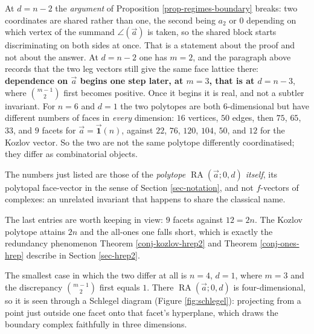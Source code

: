 \documentclass[11pt, a4paper, abstract=yes]{scrartcl}
\theoremstyle{definition}
\theoremstyle{remark}
\theoremstyle{plain}
\newcommand{\rasimp}{\angle}
\newcommand{\RA}{\operatorname{RA}}
\newcommand{\onesvec}{\vec{\mathbf 1}}
\begin{document}
At \(d=n-2\) the \emph{argument} of Proposition \ref{prop-regimes-boundary} breaks: two coordinates are
shared rather than one, the second being \(a_2\) or \(0\) depending on which vertex of the summand
\(\rasimp(\vec a)\) is taken, so the shared
block starts discriminating on both sides at once. That is a statement about the proof and not about
the answer. At \(d=n-2\) one has \(m=2\), and the paragraph above records that the two leg vectors
still give the same face lattice there: \textbf{dependence on \(\vec a\) begins one step later, at
\(m=3\), that is at \(d=n-3\)}, where \(\binom{m-1}{2}\) first becomes positive. Once it begins
it is real, and not a subtler invariant. For \(n=6\) and \(d=1\) the two polytopes are both \(6\)-dimensional but have
different numbers of faces in \emph{every} dimension: \(16\) vertices, \(50\) edges, then \(75\), \(65\),
\(33\), and \(9\) facets for \(\vec a=\onesvec(n)\), against \(22\), \(76\), \(120\), \(104\), \(50\),
and \(12\) for the Kozlov vector. So the two are not the same polytope differently coordinatised;
they differ as combinatorial objects.

The numbers just listed are those of the \emph{polytope \(\RA(\vec a;0,d)\) itself}, its polytopal
face-vector in the sense of Section \ref{sec-notation}, and not \(f\)-vectors of complexes: an
unrelated invariant that happens to share the classical name.

The last entries are worth keeping in view: \(9\) facets against \(12=2n\). The Kozlov polytope
attains \(2n\) and the all-ones one falls short, which is exactly the redundancy phenomenon
Theorem \ref{conj-kozlov-hrep2} and Theorem \ref{conj-ones-hrep} describe in Section \ref{sec-hrep2}.

The smallest case in which the two differ at all is \(n=4\), \(d=1\), where \(m=3\) and the
discrepancy \(\binom{m-1}{2}\) first equals \(1\). There \(\RA(\vec a;0,d)\) is four-dimensional,
so it is seen
through a Schlegel diagram (Figure \ref{fig:schlegel}): projecting from a point just outside one
facet onto that facet's hyperplane, which draws the boundary complex faithfully in three dimensions.
\end{document}
